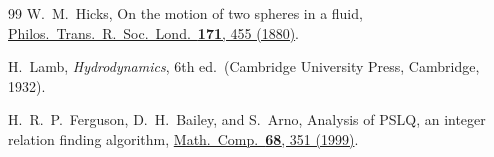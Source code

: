 \documentclass[aps,pre,10pt,twocolumn,superscriptaddress,nofootinbib]{revtex4-2}
\begin{document}
\begin{thebibliography}{99}
W.~M.~Hicks,
On the motion of two spheres in a fluid,
\href{https://doi.org/10.1098/rstl.1880.0013}{Philos.\ Trans.\ R.\ Soc.\ Lond.\ \textbf{171}, 455 (1880)}.

H.~Lamb,
\emph{Hydrodynamics}, 6th ed.\ (Cambridge University Press, Cambridge, 1932).

H.~R.~P.~Ferguson, D.~H.~Bailey, and S.~Arno,
Analysis of PSLQ, an integer relation finding algorithm,
\href{https://doi.org/10.1090/S0025-5718-99-00995-3}{Math.\ Comp.\ \textbf{68}, 351 (1999)}.

\end{thebibliography}
\end{document}

